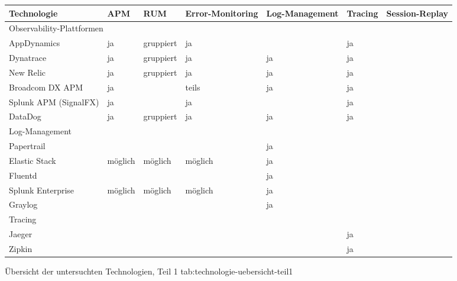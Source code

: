 %
{
\begin{tabular}{|p{2.25cm}|p{1.5cm}|p{2.0cm}|p{3.0cm}|p{3.0cm}|p{1.5cm}|p{2.5cm}|}
\hline
Technologie & APM & RUM & Error-Mo\-ni\-tor\-ing & Log-Management & Tracing & Session-Replay \\
\hline
\multicolumn{7}{|p{15.75cm}|}{Observability-Plattformen} \\
\hline
AppDynamics & ja & gruppiert & ja &  & ja &  \\
\hline
Dynatrace & ja & gruppiert & ja & ja & ja &  \\
\hline
New Relic & ja & gruppiert & ja & ja & ja &  \\
\hline
Broadcom DX APM & ja &  & teils & ja & ja &  \\
\hline
Splunk APM (SignalFX) & ja &  & ja &  & ja &  \\
\hline
DataDog & ja & gruppiert & ja & ja & ja &  \\
\hline
\multicolumn{7}{|p{15.75cm}|}{Log-Management} \\
\hline
Papertrail &  &  &  & ja &  &  \\
\hline
Elastic Stack & möglich & möglich & möglich & ja &  &  \\
\hline
Fluentd &  &  &  & ja &  &  \\
\hline
Splunk \mbox{Enterprise} & möglich & möglich & möglich & ja &  &  \\
\hline
Graylog &  &  &  & ja &  &  \\
\hline
\multicolumn{7}{|p{15.75cm}|}{Tracing} \\
\hline
Jaeger &  &  &  &  & ja &  \\
\hline
Zipkin &  &  &  &  & ja &  \\
\hline
\end{tabular}
}
{Übersicht der untersuchten Technologien, Teil 1}
{tab:technologie-uebersicht-teil1}

